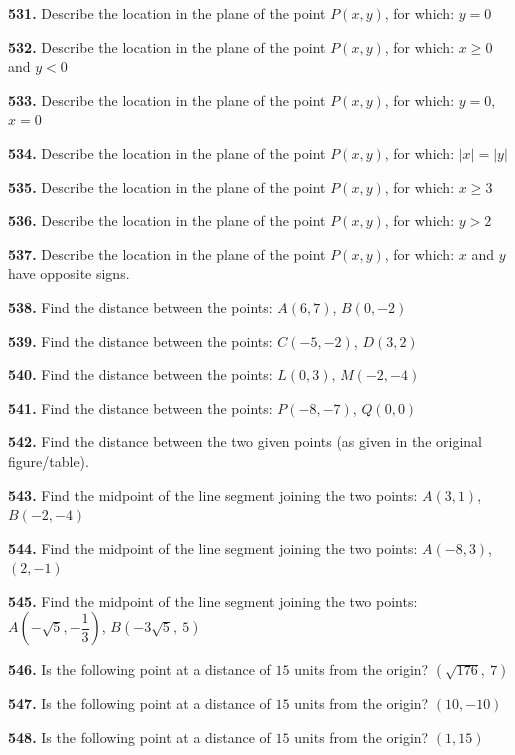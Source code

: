\documentclass[11pt]{article}
\begin{document}
\bigskip
\noindent\textbf{531.} Describe the location in the plane of the point $P(x,y)$, for which: $y=0$

\bigskip
\noindent\textbf{532.} Describe the location in the plane of the point $P(x,y)$, for which: $x\geq0$ and $y<0$

\bigskip
\noindent\textbf{533.} Describe the location in the plane of the point $P(x,y)$, for which: $y=0$, $x=0$

\bigskip
\noindent\textbf{534.} Describe the location in the plane of the point $P(x,y)$, for which: $|x|=|y|$

\bigskip
\noindent\textbf{535.} Describe the location in the plane of the point $P(x,y)$, for which: $x\geq3$

\bigskip
\noindent\textbf{536.} Describe the location in the plane of the point $P(x,y)$, for which: $y>2$

\bigskip
\noindent\textbf{537.} Describe the location in the plane of the point $P(x,y)$, for which: $x$ and $y$ have opposite signs.

\bigskip
\noindent\textbf{538.} Find the distance between the points: $A(6,7)$, $B(0,-2)$

\bigskip
\noindent\textbf{539.} Find the distance between the points: $C(-5,-2)$, $D(3,2)$

\bigskip
\noindent\textbf{540.} Find the distance between the points: $L(0,3)$, $M(-2,-4)$

\bigskip
\noindent\textbf{541.} Find the distance between the points: $P(-8,-7)$, $Q(0,0)$

\bigskip
\noindent\textbf{542.} Find the distance between the two given points (as given in the original figure/table).

\bigskip
\noindent\textbf{543.} Find the midpoint of the line segment joining the two points: $A(3,1)$, $B(-2,-4)$

\bigskip
\noindent\textbf{544.} Find the midpoint of the line segment joining the two points: $A(-8,3)$, $(2,-1)$

\bigskip
\noindent\textbf{545.} Find the midpoint of the line segment joining the two points: $A\left(-\sqrt{5},-\dfrac{1}{3}\right)$, $B(-3\sqrt{5},\ 5)$

\bigskip
\noindent\textbf{546.} Is the following point at a distance of $15$ units from the origin? $(\sqrt{176},\ 7)$

\bigskip
\noindent\textbf{547.} Is the following point at a distance of $15$ units from the origin? $(10,-10)$

\bigskip
\noindent\textbf{548.} Is the following point at a distance of $15$ units from the origin? $(1,15)$
\end{document}
